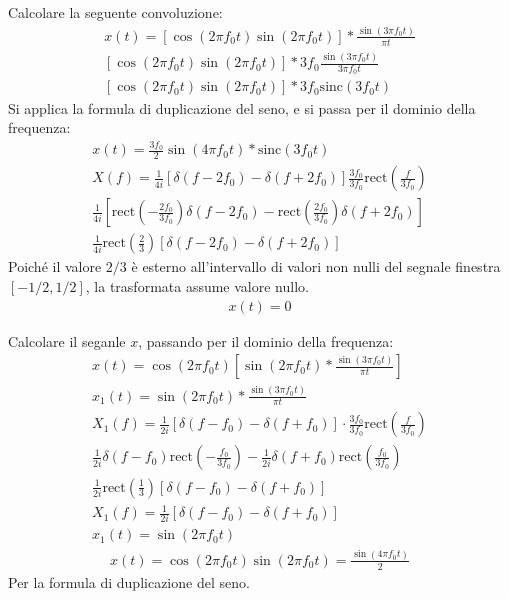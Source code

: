 \documentclass{article}
\begin{document}
Calcolare la seguente convoluzione:
\begin{gather*}
    x(t)=\left[\cos(2\pi f_0t)\sin(2\pi f_0t)\right]*\displaystyle\frac{\sin(3\pi f_0t)}{\pi t}\\
    \left[\cos(2\pi f_0t)\sin(2\pi f_0t)\right]*\displaystyle3f_0\frac{\sin(3\pi f_0t)}{3\pi f_0t}\\
    \left[\cos(2\pi f_0t)\sin(2\pi f_0t)\right]*3f_0\mbox{sinc}(3f_0 t)
\end{gather*}
Si applica la formula di duplicazione del seno, e si passa per il dominio della frequenza:
\begin{gather*}
    x(t)=\displaystyle\frac{3f_0}{2}\sin(4\pi f_0t)*\mbox{sinc}(3f_0t)\\
    X(f)=\displaystyle\frac{1}{4i}\left[\delta(f-2f_0)-\delta(f+2f_0)\right]\frac{3f_0}{3f_0}\mbox{rect}\left(\frac{f}{3f_0}\right)\\
    \displaystyle\frac{1}{4i}\left[\mbox{rect}\left(-\frac{2f_0}{3f_0}\right)\delta(f-2f_0)-\mbox{rect}\left(\frac{2f_0}{3f_0}\right)\delta(f+2f_0)\right]\\
    \displaystyle\frac{1}{4i}\mbox{rect}\left(\frac{2}{3}\right)\left[\delta(f-2f_0)-\delta(f+2f_0)\right]
\end{gather*}
Poiché il valore $2/3$ è esterno all'intervallo di valori non nulli del segnale finestra $[-1/2,1/2]$, la trasformata assume valore nullo. 
\begin{gather}
    x(t)=0
\end{gather}


Calcolare il seganle $x$, passando per il dominio della frequenza:
\begin{gather*}
    x(t)=\cos(2\pi f_0t)\left[\sin(2\pi f_0t)*\displaystyle\frac{\sin(3\pi f_0t)}{\pi t}\right]\\
    x_1(t)=\sin(2\pi f_0t)*\displaystyle\frac{\sin(3\pi f_0t)}{\pi t}\\
    X_1(f)=\displaystyle\frac{1}{2i}\left[\delta(f-f_0)-\delta(f+f_0)\right]\cdot \frac{3f_0}{3f_0}\mbox{rect}\left(\frac{f}{3f_0}\right)\\
    \displaystyle\frac{1}{2i}\delta(f-f_0)\mbox{rect}\left(-\frac{f_0}{3f_0}\right)-\frac{1}{2i}\delta(f+f_0)\mbox{rect}\left(\frac{f_0}{3f_0}\right)\\
    \displaystyle\frac{1}{2i}\mbox{rect}\left(\frac{1}{3}\right)\left[\delta(f-f_0)-\delta(f+f_0)\right]\\
    X_1(f)=\displaystyle\frac{1}{2i}\left[\delta(f-f_0)-\delta(f+f_0)\right]\\
    x_1(t)=\sin(2\pi f_0t)
\end{gather*}
\begin{gather}
    x(t)=\cos(2\pi f_0t)\sin(2\pi f_0t)=\displaystyle\frac{\sin(4\pi f_0t)}{2}
\end{gather}
Per la formula di duplicazione del seno. 
\end{document}
